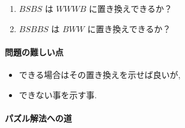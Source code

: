 \documentclass[a4j]{jarticle}
\begin{document}
\begin{enumerate}
\item \(BSBS\) は \(WWWB\) に置き換えできるか？

\item \(BSBBS\) は \(BWW\) に置き換えできるか？
\end{enumerate}

\paragraph{問題の難しい点}
\label{sec:orgb2426f7}

\begin{itemize}
\item できる場合はその置き換えを示せば良いが,

\item できない事を示す事.
\end{itemize}

\paragraph{パズル解法への道}
\label{sec:org7eb8929}
\end{document}

